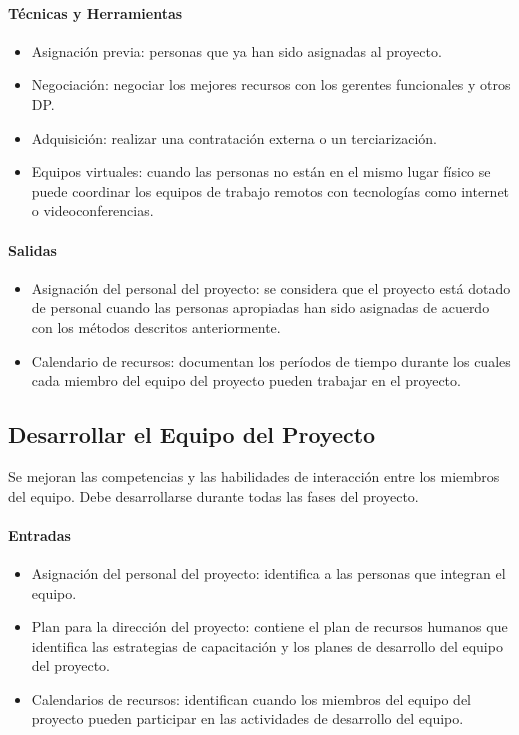\documentclass[a4paper,twosides]{article}
\newlength{\wideitemsep}
\let\olditem\item
\renewcommand{\item}{\setlength{\itemsep}{\wideitemsep}\olditem}
\begin{document}
\paragraph{Técnicas y Herramientas}
\begin{itemize}
\item Asignación previa: personas que ya han sido asignadas al proyecto.
\item Negociación: negociar los mejores recursos con los gerentes funcionales y otros DP.
\item Adquisición: realizar una contratación externa o un terciarización.
\item Equipos virtuales: cuando las personas no están en el mismo lugar físico se puede coordinar los equipos de trabajo remotos con tecnologías como internet o videoconferencias.
\end{itemize}

\paragraph{Salidas}
\begin{itemize}
\item Asignación del personal del proyecto: se considera que el proyecto está dotado de personal cuando las personas apropiadas han sido asignadas de acuerdo con los métodos descritos anteriormente.
\item Calendario de recursos: documentan los períodos de tiempo durante los cuales cada miembro del equipo del proyecto pueden trabajar en el proyecto.
\end{itemize}

\subsection{Desarrollar el Equipo del Proyecto} \label{sec:desarrollar_equipo}
Se mejoran las competencias y las habilidades de interacción entre los miembros del equipo. Debe desarrollarse durante todas las fases del proyecto.

\paragraph{Entradas}
\begin{itemize}
\item Asignación del personal del proyecto: identifica a las personas que integran el equipo.
\item Plan para la dirección del proyecto: contiene el plan de recursos  humanos que identifica las estrategias de capacitación y los planes de desarrollo del equipo del proyecto.
\item Calendarios de recursos: identifican cuando los miembros del equipo del proyecto pueden participar en las actividades de desarrollo del equipo.
\end{itemize}
\end{document}
